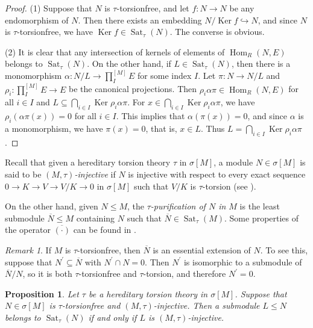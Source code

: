 \documentclass{amsart}
\newtheorem{prop}[thm]{Proposition}
\theoremstyle{definition}
\theoremstyle{remark}
\newtheorem{rem}[thm]{Remark}
\numberwithin{equation}{section}
\DeclareMathOperator{\Ker}{Ker}
\DeclareMathOperator{\Hom}{Hom}
\DeclareMathOperator{\Sat}{Sat}
\newcommand{\sm}{\sigma[M]}
\begin{document}
	\begin{proof}
		(1) 
		Suppose that $N$ is $\tau$-torsionfree, 
		and let $f:N\to N$ be any endomorphism of $N$. 
		Then there exists an embedding $N/\Ker f\hookrightarrow N$, 
		and since $N$ is $\tau$-torsionfree, we have $\Ker f\in \Sat_\tau(N)$. 
		The converse is obvious.
		
		(2) 
		It is clear that 
		any intersection of kernels of elements of $\Hom_R (N,E)$ 
		belongs to $\Sat_\tau(N)$. 
		On the other hand, if $L\in\Sat_\tau(N)$, 
		then there is a monomorphism 
		$\alpha:N/L\to\prod_I^{[M]}E$ for some index $I$. 
		Let $\pi:N\to N/L$ and 
		$\rho_i:\prod_I^{[M]}E\to E$ be the canonical projections. 
		Then $\rho_i\alpha\pi\in\Hom_R(N,E)$ 
		for all $i\in I$ and $L\subseteq\bigcap_{i\in I}\Ker \rho_i\alpha\pi$. 
		For $x\in\bigcap_{i\in I}\Ker \rho_i\alpha\pi$, 
		we have $\rho_i(\alpha\pi(x))=0$ for all $i\in I$. 
		This implies that $\alpha(\pi(x))=0$, 
		and since $\alpha$ is a monomorphism, 
		we have $\pi(x)=0$, that is, $x\in L$. 
		Thus $L=\bigcap_{i\in I}\Ker \rho_i\alpha\pi$.
	\end{proof}
	
	Recall that given a hereditary torsion theory $\tau$ in $\sm$, 
	a module $N\in\sm$ is said to be 
	\emph{$(M,\tau)$-injective} 
	if $N$ is injective with respect to every exact sequence 
	$0\to K\to V\to V/K\to 0$ in $\sm$ 
	such that $V/K$ is $\tau$-torsion 
	(see \cite[p.\ 61]{wisbauermodules}).
	
	On the other hand, given $N\leq M$, the \emph{$\tau$-purification of $N$ in $M$} 
	is the least submodule $\overline{N}\leq M$ 
	containing $N$ such that $\overline{N}\in\Sat_\tau(M)$. 
	Some properties of the operator $\overline{(\cdot)}$ 
	can be found in \cite[Lemma 2.2]{PepeKrull}.
	
	\begin{rem}\label{essintpur}
	If $M$ is $\tau$-torsionfree,
	then $\overline{N}$ is an essential extension of $N$.
	To see this, 
	suppose that $N^{\prime} \subseteq \overline{N}$ 
	with $N^{\prime} \cap N = 0$.
	Then $N^{\prime}$ is isomorphic to a submodule of $\overline{N} / N$,
	so it is both $\tau$-torsionfree and $\tau$-torsion, 
	and therefore $N^{\prime} = 0$.
	\end{rem}  
	
	\begin{prop}\label{sat}
		Let $\tau$ be a hereditary torsion theory in $\sm$. 
		Suppose that $N\in\sm$ is $\tau$-torsionfree and $(M,\tau)$-injective. 
		Then a submodule $L\leq N$ belongs to $\Sat_\tau(N)$ 
		if and only if $L$ is $(M,\tau)$-injective.
	\end{prop}
	
\end{document}
